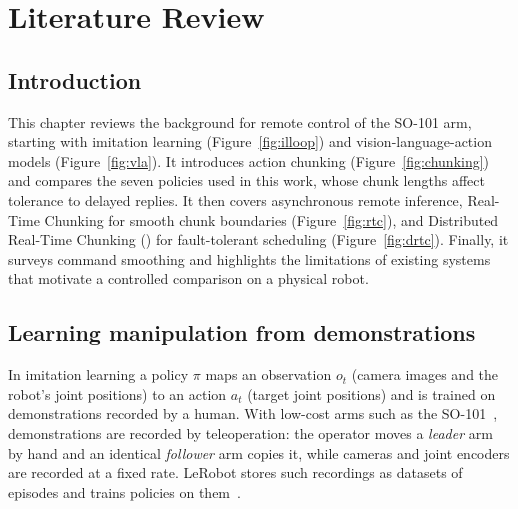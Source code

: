 \chapter{Literature Review}\label{ch:background}

\section{Introduction}
This chapter reviews the background for remote control of the SO-101 arm, starting with imitation learning (Figure~\ref{fig:illoop}) and vision-language-action models (Figure~\ref{fig:vla}). It introduces action chunking (Figure~\ref{fig:chunking}) and compares the seven policies used in this work, whose chunk lengths affect tolerance to delayed replies. It then covers asynchronous remote inference, Real-Time Chunking for smooth chunk boundaries (Figure~\ref{fig:rtc}), and Distributed Real-Time Chunking (\drtc{}) for fault-tolerant scheduling (Figure~\ref{fig:drtc}). Finally, it surveys command smoothing and highlights the limitations of existing systems that motivate a controlled comparison on a physical robot.

\section{Learning manipulation from demonstrations}

In imitation learning a policy $\pi$ maps an observation $o_t$ (camera images and the robot's joint positions) to an
action $a_t$ (target joint positions) and is trained on demonstrations recorded by a human. With low-cost arms such as
the SO-101~\cite{so101}, demonstrations are recorded by teleoperation: the operator moves a \emph{leader} arm by hand
and an identical \emph{follower} arm copies it, while cameras and joint encoders are recorded at a fixed rate. LeRobot
stores such recordings as datasets of episodes and trains policies on them~\cite{lerobot}.


